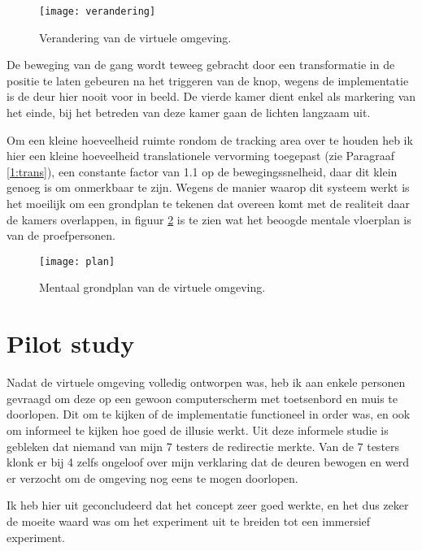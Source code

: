 \begin{figure}[t!]
    \centering
    \texttt{[image: verandering]}
    \caption{Verandering van de virtuele omgeving.}
    \label{fig:verandering}
\end{figure}

De beweging van de gang wordt teweeg gebracht door een transformatie in de
positie te laten gebeuren na het triggeren van de knop, wegens de implementatie
is de deur hier nooit voor in beeld. De vierde kamer dient enkel als markering 
van het einde, bij het betreden van deze kamer gaan de lichten langzaam uit.

Om een kleine hoeveelheid ruimte rondom de tracking area over te houden heb ik
hier een kleine hoeveelheid translationele vervorming toegepast (zie Paragraaf 
\ref{1:trans}), een constante factor van 1.1 op de bewegingssnelheid, daar dit 
klein genoeg is om onmerkbaar te zijn\cite{steinicke09}. Wegens de manier waarop 
dit systeem werkt is het moeilijk om een grondplan te tekenen dat overeen komt 
met de realiteit daar de kamers overlappen, in figuur \ref{fig:plan} is te zien 
wat het beoogde mentale vloerplan is van de proefpersonen.

\begin{figure}[h!]
    \centering
    \texttt{[image: plan]}
    \caption{Mentaal grondplan van de virtuele omgeving.}
    \label{fig:plan}
\end{figure}


\section{Pilot study}
Nadat de virtuele omgeving volledig ontworpen was, heb ik aan enkele personen
gevraagd om deze op een gewoon computerscherm met toetsenbord en muis te
doorlopen. Dit om te kijken of de implementatie functioneel in order was, en
ook om informeel te kijken hoe goed de illusie werkt. Uit deze informele studie 
is gebleken dat niemand van mijn 7 testers de redirectie merkte. Van de 7 testers
klonk er bij 4 zelfs ongeloof over mijn verklaring dat de deuren bewogen en werd
er verzocht om de omgeving nog eens te mogen doorlopen.

Ik heb hier uit geconcludeerd dat het concept zeer goed werkte, en het dus zeker
de moeite waard was om het experiment uit te breiden tot een immersief 
experiment.